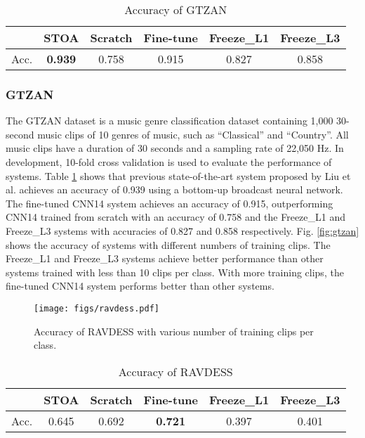 \documentclass[journal]{IEEEtran}
\begin{document}
\begin{table}[t]
\centering
\caption{Accuracy of GTZAN}
\label{table:gtzan}
\begin{tabular}{*{6}{c}}
 \toprule
 & STOA \cite{liu2019bottom} & Scratch & Fine-tune & Freeze\_L1 & Freeze\_L3 \\
 \midrule
 Acc. & \textbf{0.939} & 0.758 & 0.915 & 0.827 & 0.858 \\
 \bottomrule
\end{tabular}
\end{table}



\subsubsection{GTZAN}
The GTZAN dataset \cite{tzanetakis2002musical} is a music genre classification dataset containing 1,000 30-second music clips of 10 genres of music, such as ``Classical'' and ``Country''. All music clips have a duration of 30 seconds and a sampling rate of 22,050 Hz. In development, 10-fold cross validation is used to evaluate the performance of systems. Table \ref{table:gtzan} shows that previous state-of-the-art system proposed by Liu et al. \cite{liu2019bottom} achieves an accuracy of 0.939 using a bottom-up broadcast neural network. The fine-tuned CNN14 system achieves an accuracy of 0.915, outperforming CNN14 trained from scratch with an accuracy of 0.758 and the Freeze\_L1 and Freeze\_L3 systems with accuracies of 0.827 and 0.858 respectively. Fig. \ref{fig:gtzan} shows the accuracy of systems with different numbers of training clips. The Freeze\_L1 and Freeze\_L3 systems achieve better performance than other systems trained with less than 10 clips per class. With more training clips, the fine-tuned CNN14 system performs better than other systems. 

\begin{figure}[t!]
  \centering
  \centerline{\texttt{[image: figs/ravdess.pdf]}}
  \caption{Accuracy of RAVDESS with various number of training clips per class.}
  \label{fig:ravdess}
\end{figure}

\begin{table}[t!]
\centering
\caption{Accuracy of RAVDESS}
\label{table:ravdness}
\begin{tabular}{*{6}{c}}
 \toprule
 & STOA \cite{zeng2019spectrogram} & Scratch & Fine-tune & Freeze\_L1 & Freeze\_L3 \\
 \midrule
 Acc. & 0.645 & 0.692 & \textbf{0.721} & 0.397 & 0.401 \\
 \bottomrule
\end{tabular}
\end{table}
\end{document}
